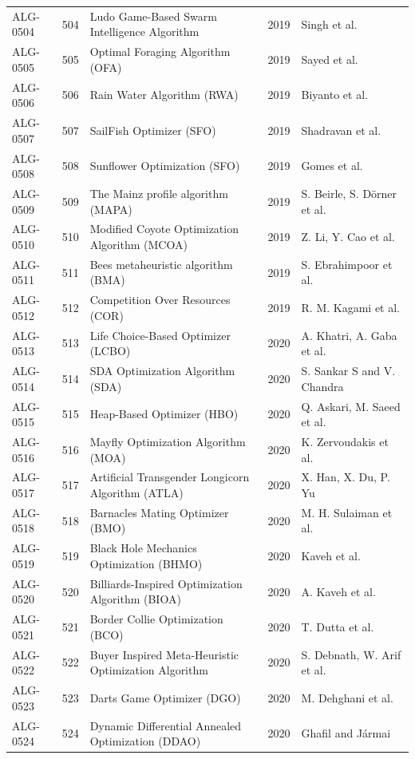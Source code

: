 \documentclass[8pt]{article}
\begin{document}
\begin{landscape}
\begin{longtable}{P{1.7cm}rP{10.0cm}rP{7.2cm}}
ALG-0504 & 504 & Ludo Game-Based Swarm Intelligence Algorithm & 2019 & Singh et al. \\
ALG-0505 & 505 & Optimal Foraging Algorithm (OFA) & 2019 & Sayed et al. \\
ALG-0506 & 506 & Rain Water Algorithm (RWA) & 2019 & Biyanto et al. \\
ALG-0507 & 507 & SailFish Optimizer (SFO) & 2019 & Shadravan et al. \\
ALG-0508 & 508 & Sunflower Optimization (SFO) & 2019 & Gomes et al. \\
ALG-0509 & 509 & The Mainz profile algorithm (MAPA) & 2019 & S. Beirle, S. Dörner et al. \\
ALG-0510 & 510 & Modified Coyote Optimization Algorithm (MCOA) & 2019 & Z. Li, Y. Cao et al. \\
ALG-0511 & 511 & Bees metaheuristic algorithm (BMA) & 2019 & S. Ebrahimpoor et al. \\
ALG-0512 & 512 & Competition Over Resources (COR) & 2019 & R. M. Kagami et al. \\
ALG-0513 & 513 & Life Choice-Based Optimizer (LCBO) & 2020 & A. Khatri, A. Gaba et al. \\
ALG-0514 & 514 & SDA Optimization Algorithm (SDA) & 2020 & S. Sankar S and V. Chandra \\
ALG-0515 & 515 & Heap-Based Optimizer (HBO) & 2020 & Q. Askari, M. Saeed et al. \\
ALG-0516 & 516 & Mayfly Optimization Algorithm (MOA) & 2020 & K. Zervoudakis et al. \\
ALG-0517 & 517 & Artificial Transgender Longicorn Algorithm (ATLA) & 2020 & X. Han, X. Du, P. Yu \\
ALG-0518 & 518 & Barnacles Mating Optimizer (BMO) & 2020 & M. H. Sulaiman et al. \\
ALG-0519 & 519 & Black Hole Mechanics Optimization (BHMO) & 2020 & Kaveh et al. \\
ALG-0520 & 520 & Billiards-Inspired Optimization Algorithm (BIOA) & 2020 & A. Kaveh et al. \\
ALG-0521 & 521 & Border Collie Optimization (BCO) & 2020 & T. Dutta et al. \\
ALG-0522 & 522 & Buyer Inspired Meta-Heuristic Optimization Algorithm & 2020 & S. Debnath, W. Arif et al. \\
ALG-0523 & 523 & Darts Game Optimizer (DGO) & 2020 & M. Dehghani et al. \\
ALG-0524 & 524 & Dynamic Differential Annealed Optimization (DDAO) & 2020 & Ghafil and Jármai \\

\end{longtable}
\end{landscape}
\end{document}
